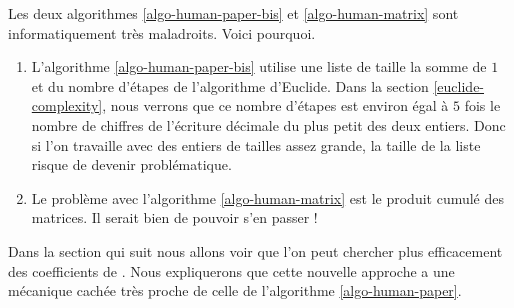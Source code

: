 Les deux algorithmes \ref{algo-human-paper-bis} et  \ref{algo-human-matrix} sont informatiquement très maladroits. Voici pourquoi.

\begin{enumerate}
	\item L'algorithme \ref{algo-human-paper-bis} utilise une liste de taille la somme de $1$ et du nombre d'étapes de l'algo\-rithme d'Euclide.
	Dans la section \ref{euclide-complexity}, nous verrons que ce nombre d'étapes est environ égal à $5$ fois le nombre de chiffres de l'écriture décimale du plus petit des deux entiers.
	Donc si l'on travaille avec des entiers de tailles assez grande, la taille de la liste risque de devenir problématique.


	\item Le problème avec l'algorithme \ref{algo-human-matrix} est le produit cumulé des matrices. Il serait bien de pouvoir s'en passer !
\end{enumerate}

Dans la section qui suit nous allons voir que l'on peut chercher plus efficacement des coefficients de \bb{}.
Nous expliquerons que cette nouvelle approche a une mécanique cachée très proche de celle de l'algorithme \ref{algo-human-paper}.
